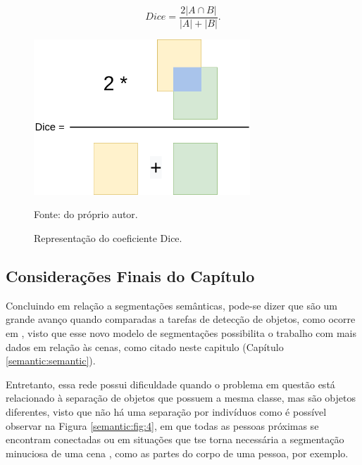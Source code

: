 \begin{equation}
    \label{semantic:eq:6}
    Dice = \frac{2|A \cap B|}{|A| + |B|}.
\end{equation}

\begin{figure}[H]
    \centering
    \caption{Representação do coeficiente Dice.}
    \includegraphics[height=2.3in]{recursos/imagens/semantic/dice.png}
    \label{semantic:fig:2}

    \vspace*{1 cm}
    Fonte: do próprio autor.
\end{figure}


\subsection{Considerações Finais do Capítulo}
\label{semantic:conclusion}

Concluindo em relação a segmentações semânticas, pode-se dizer que são um grande avanço quando comparadas a tarefas de detecção de objetos, como ocorre em \cite{Vaillant1994}, visto que esse novo modelo de segmentações possibilita o trabalho com mais dados em relação às cenas, como citado neste capitulo (Capítulo \ref{semantic:semantic}).

Entretanto, essa rede possui dificuldade quando o problema em questão está relacionado à separação de objetos que possuem a mesma classe, mas são objetos diferentes, visto que não há uma separação por indivíduos \cite{Kirillov2019a} como é possível observar na Figura \ref{semantic:fig:4}, em que todas as pessoas próximas se encontram conectadas ou em situações que tse torna necessária a segmentação minuciosa de uma cena \cite{Ghosh2019}, como as partes do corpo de uma pessoa, por exemplo.


